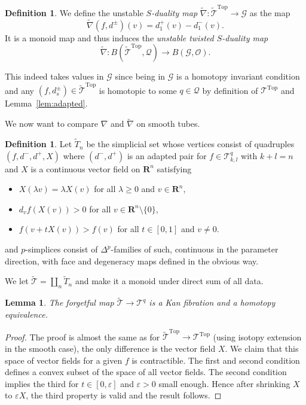 \documentclass[reqno]{amsart}
\renewcommand{\epsilon}{\varepsilon}
\theoremstyle{theorem}
\newtheorem{lemma}[corollary]{Lemma}
\theoremstyle{remark}
\theoremstyle{definition}
\newtheorem{definition}[corollary]{Definition}
\newcommand{\tnabla}{\widetilde{\nabla}}
\newcommand{\T}{\mathcal{T}}
\newcommand{\R}{\mathbf{R}}
\newcommand{\TT}{\widetilde{\mathcal{T}}}
\newcommand{\GG}{\mathcal{G}}
\newcommand{\QQ}{\mathcal{Q}}
\newcommand{\OO}{\mathcal{O}}
\newcommand{\TOP}{\mathrm{Top}}
\begin{document}
\begin{definition}\label{dfn:dualitymaps}
  We define the unstable \emph{$S$-duality map} $\tnabla : \TT^\TOP\to \GG$ as the map
  \[\tnabla(f,d^\pm) (v)=d_1^+(v)-d_1^-(v).\]
  It is a monoid map and thus induces the \emph{unstable twisted $S$-duality map}
  \[\tnabla : B(\TT^\TOP,\QQ)\to B(\GG, \OO).\]
\end{definition}
This indeed takes values in $\GG$ since being in $\GG$ is a homotopy invariant condition and
any $(f,d_s^\pm)\in \TT^\TOP$ is homotopic to some $q\in \QQ$ by definition of $\T^\TOP$ and Lemma~\ref{lem:adapted}.


We now want to compare $\nabla$ and $\tnabla$ on smooth tubes.


\begin{definition}
Let $\widetilde{T}_n$ be the simplicial set whose vertices consist of quadruples $(f,d^-,d^+,X)$ where
$(d^-,d^+)$ is an adapted pair for $f\in \T_{k,l}^q$ with $k+l=n$ and $X$ is a continuous vector field on $\R^n$ satisfying
\begin{itemize}
\item $X(\lambda v)=\lambda X(v)$ for all $\lambda\geq 0$ and $v\in \R^n$,
\item $d_v f(X(v))>0$ for all $v\in \R^n\setminus\{0\}$,
\item $f(v+tX(v))>f(v)$ for all $t\in [0,1]$ and $v\neq 0$.
\end{itemize}
and $p$-simplices consist of $\Delta^p$-families of such, continuous in the parameter direction,
with face and degeneracy maps defined in the obvious way.
\end{definition}


We let $\TT=\coprod_n \widetilde{T}_n$ and make it a monoid under direct sum of all data.


\begin{lemma}\label{lem:forgetilde}
The forgetful map $\TT \to \T^q$ is a Kan fibration and a homotopy equivalence.
\end{lemma}
\begin{proof}
The proof is almost the same as for $\TT^\TOP \to \T^\TOP$ (using isotopy extension in the smooth case),
the only difference is the vector field $X$. We claim that this space of vector fields for a given $f$ is contractible.
The first and second condition defines a convex subset of the space of all vector fields.
The second condition implies the third for $t\in[0,\epsilon]$ and $\epsilon>0$ small enough.
Hence after shrinking $X$ to $\epsilon X$, the third property is valid and the result follows. 
\end{proof}
\end{document}
